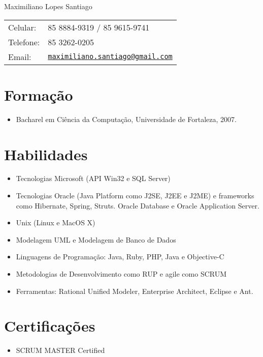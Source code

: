 \documentclass[letterpaper]{article}
\def\name{Maximiliano Lopes Santiago}
\begin{document}
\begin{flushright}

{\huge \name}


\vspace{0.25in}
\begin{minipage}{0.45\linewidth}
  \begin{tabular}{ll}
    Celular: & 85 8884-9319 / 85 9615-9741 \\
    Telefone: & 85 3262-0205 \\
    Email: & \href{mailto:maximiliano.santiago@gmail.com}{\tt maximiliano.santiago@gmail.com} \\
  \end{tabular}
\end{minipage}
\end{flushright}

\section*{Formação}

\begin{itemize}
  \item Bacharel em Ciência da Computação, Universidade de Fortaleza, 2007.
\end{itemize}

\section*{Habilidades}
\begin{itemize}
  \item Tecnologias Microsoft (API Win32 e SQL Server)
  \item Tecnologias Oracle (Java Platform como J2SE, J2EE e J2ME) e frameworks como Hibernate, Spring, Struts.
    Oracle Database e Oracle Application Server.
  \item Unix (Linux e MacOS X)
  \item Modelagem UML e Modelagem de Banco de Dados
  \item Linguagens de Programação: Java, Ruby, PHP, Java e Objective-C
  \item Metodologias de Desenvolvimento como RUP e agile como SCRUM
  \item Ferramentas: Rational Unified Modeler, Enterprise Architect, Eclipse e Ant.
\end{itemize}

\section*{Certificações}
\begin{itemize}
  \item SCRUM MASTER Certified
\end{itemize}
\end{document}
